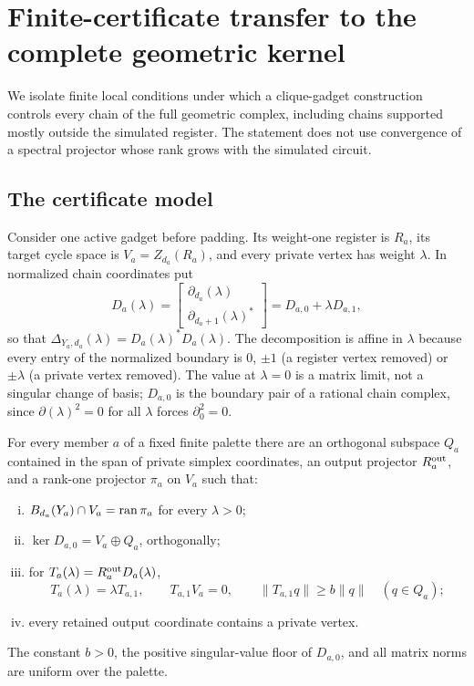 \section{Finite-certificate transfer to the complete geometric kernel}
\label{sec:transfer}

We isolate finite local conditions under which a clique-gadget construction
controls every chain of the full geometric complex, including chains
supported mostly outside the simulated register.  The statement does not use
convergence of a spectral projector whose rank grows with the simulated
circuit.

\subsection{The certificate model}

Consider one active gadget before padding.  Its weight-one register is \(R_a\),
its target cycle space is \(V_a=Z_{d_a}(R_a)\), and every private vertex has
weight \(\lambda\).  In normalized chain coordinates put
\[
D_a(\lambda)=
\begin{bmatrix}\partial_{d_a}(\lambda)\\
\partial_{d_a+1}(\lambda)^*\end{bmatrix}
=D_{a,0}+\lambda D_{a,1},
\]
so that \(\Delta_{Y_a,d_a}(\lambda)=D_a(\lambda)^*D_a(\lambda)\).  The
decomposition is affine in \(\lambda\) because every entry of the normalized
boundary is \(0\), \(\pm1\) (a register vertex removed) or \(\pm\lambda\) (a
private vertex removed).  The value at \(\lambda=0\) is a matrix limit, not
a singular change of basis; \(D_{a,0}\) is the boundary pair of a rational
chain complex, since \(\partial(\lambda)^2=0\) for all \(\lambda\) forces
\(\partial_0^2=0\).

\begin{assumption}
\label{ass:local-certificate}
For every member \(a\) of a fixed finite palette there are an orthogonal
subspace \(Q_a\) contained in the span of private simplex coordinates, an
output projector \(R_a^{\rm out}\), and a rank-one
projector \(\pi_a\) on \(V_a\) such that:
\begin{enumerate}[(i)]
\item \(B_{d_a}(Y_a)\cap V_a=\operatorname{ran}\pi_a\) for every \(\lambda>0\);
\item \(\ker D_{a,0}=V_a\oplus Q_a\), orthogonally;
\item for \(T_a(\lambda)=R_a^{\rm out}D_a(\lambda)\),
\[
T_a(\lambda)=\lambda T_{a,1},\qquad T_{a,1}V_a=0,\qquad
\|T_{a,1}q\|\ge b\|q\|\quad(q\in Q_a);
\]
\item every retained output coordinate contains a private vertex.
\end{enumerate}
The constant \(b>0\), the positive singular-value floor of \(D_{a,0}\), and
all matrix norms are uniform over the palette.
\end{assumption}

